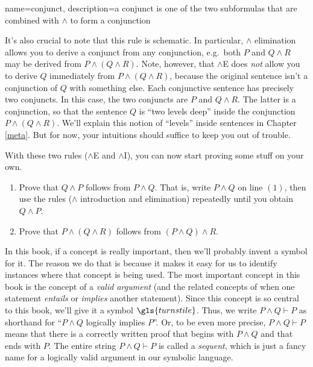 {
  name=conjunct,
  description={a conjunct is one of the two subformulas that are combined with
    $\wedge$ to form a conjunction}
}

It's also crucial to note that this rule is schematic.  In particular,
$\wedge$ elimination allows you to derive a \gls{conjunct} from any
conjunction, e.g.\ both $P$ and $Q\wedge R$ may be derived from
$P\wedge (Q\wedge R)$.  Note, however, that $\wedge$E does
\textit{not} allow you to derive $Q$ immediately from
$P\wedge (Q\wedge R)$, because the original sentence isn't a
conjunction of $Q$ with something else.  Each conjunctive sentence has
precisely two conjuncts.  In this case, the two conjuncts are $P$ and
$Q\wedge R$.  The latter is a conjunction, so that the sentence $Q$ is
``two levels deep'' inside the conjunction $P\wedge (Q\wedge R)$.
We'll explain this notion of ``levels'' inside sentences in Chapter
\ref{meta}.  But for now, your intuitions should suffice to keep you
out of trouble.

With these two rules ($\wedge$E and $\wedge$I), you can now start
proving some stuff on your own.

\begin{exercises} \mbox{}
  \begin{enumerate}
  \item Prove that $Q\wedge P$ follows from $P\wedge Q$.  That is,
    write $P\wedge Q$ on line $(1)$, then use the rules ($\wedge$
    introduction and elimination) repeatedly until you obtain
    $Q\wedge P$.
  \item Prove that $P\wedge (Q\wedge R)$ follows from
    $(P\wedge Q)\wedge R$.
    \end{enumerate}
\end{exercises}

In this book, if a concept is really important, then we'll probably
invent a symbol for it.  The reason we do that is because it makes it
easy for us to identify instances where that concept is being used.
The most important concept in this book is the concept of a
\emph{valid argument} (and the related concepts of when one statement
\emph{entails} or \emph{implies} another statement).  Since this
concept is so central to this book, we'll give it a symbol
$\gls{turnstile}$.  Thus, we write $P\wedge Q\vdash P$ as shorthand
for ``$P\wedge Q$ logically implies $P$''.  Or, to be even more
precise, $P\wedge Q\vdash P$ means that there is a correctly written
proof that begins with $P\wedge Q$ and that ends with $P$.  The entire
string $P\wedge Q\vdash P$ is called a \emph{\gls{sequent}}, which is
just a fancy name for a logically valid argument in our symbolic
language. 

